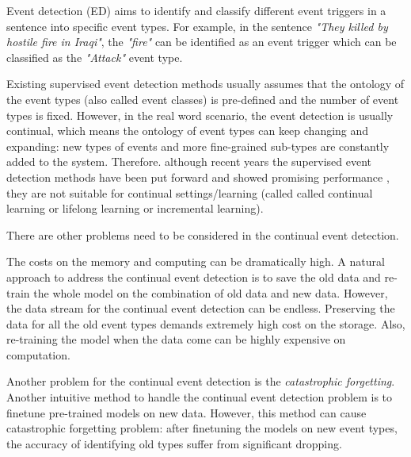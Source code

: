 Event detection (ED) aims to identify and classify different event triggers in a sentence into specific event types. For example, in the sentence \textit{"They killed by hostile fire in Iraqi"}, the \textit{"fire"} can be identified as an event trigger which can be classified as the \textit{"Attack"} event type.

Existing supervised event detection methods usually assumes that the ontology of the event types (also called event classes) is pre-defined and the number of event types is fixed. However, in the real word scenario, the event detection is usually continual, which means the ontology of event types can keep changing and expanding: new types of events and more fine-grained sub-types are constantly added to the system. Therefore. although recent years the supervised event detection methods have been put forward and showed promising performance \citep{chen2015event, du2020event, liu2020event, lu2021text2event}, they are not suitable for continual settings/learning (called called continual learning or lifelong learning or incremental learning)\citep{ring1994continual, thrun1998lifelong, cao2020incremental}. 

There are other problems need to be considered in the continual event detection.

The costs on the memory and computing can be dramatically high. A natural approach to address the continual event detection is to save the old data and re-train the whole model on the combination of old data and new data. However, the data stream for the continual event detection can be endless. Preserving the data for all the old event types demands extremely high cost on the storage. Also, re-training the model when the data come can be highly expensive on computation. 

Another problem for the continual event detection is the \textit{catastrophic forgetting}\citep{mccloskey1989catastrophic, french1999catastrophic}. Another intuitive method to handle the continual event detection problem is to finetune pre-trained models on new data. However, this method can cause catastrophic forgetting problem: after finetuning the models on new event types, the accuracy of identifying old types suffer from significant dropping. 

